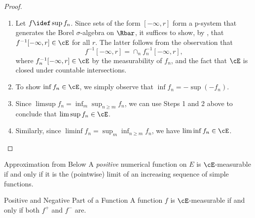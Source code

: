 \begin{proof}
	\begin{enumerate}
		\item Let $f \idef \sup f_n$. Since sets of the form $[-\infty, r]$ form a p-system that generates the Borel $\sigma$-algebra on $\Rbar$, it suffices to show, by , that $f^{-1}[-\infty, r] \in \cE$ for all $r$. The latter follows from the observation that
		      \begin{equation*}
			      f^{-1}[-\infty, r] = \cap_n f_n^{-1}[-\infty, r],
		      \end{equation*}
		      where $f_n^{-1}[-\infty, r] \in \cE$ by the measurability of $f_n$, and the fact that $\cE$ is closed under countable intersections.
		\item To show $\inf f_n \in \cE$, we simply observe that $\inf f_n = - \sup(-f_n)$.
		\item Since $\limsup f_n = \inf_m \sup_{n \ge m} f_n$, we can use Steps 1 and 2 above to conclude that $\limsup f_n \in \cE$.
		\item Similarly, since $\liminf f_n = \sup_m \inf_{n \ge m} f_n$, we have $\liminf f_n \in \cE$.
	\end{enumerate}
\end{proof}

\begin{thm}{Approximation from Below}{}
	A \textit{positive} numerical function on $E$ is $\cE$-measurable if and only if it is the (pointwise) limit of an increasing sequence of simple functions.
\end{thm}

\begin{thm}{Positive and Negative Part of a Function}{}
	A function $f$ is $\cE$-measurable if and only if both $f^+$ and $f^-$ are.
\end{thm}

